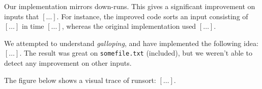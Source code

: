 \documentclass{tufte-handout}
\begin{document}
  Our implementation mirrors down-runs.
    This gives a significant improvement on inputs that $[\ldots]$.
  For instance, the improved code sorts an input consisting of $[\ldots]$ in time
  $[\ldots]$, whereas the original implementation used $[\ldots]$. 

  We attempted to understand \emph{galloping}, and have implemented the following idea: $[\ldots]$.
  The result was great on {\tt somefile.txt} (included), but we weren't able to detect any improvement on other inputs. 


  The figure below shows a visual trace of runsort:
  $[\ldots]$.
\end{document}
